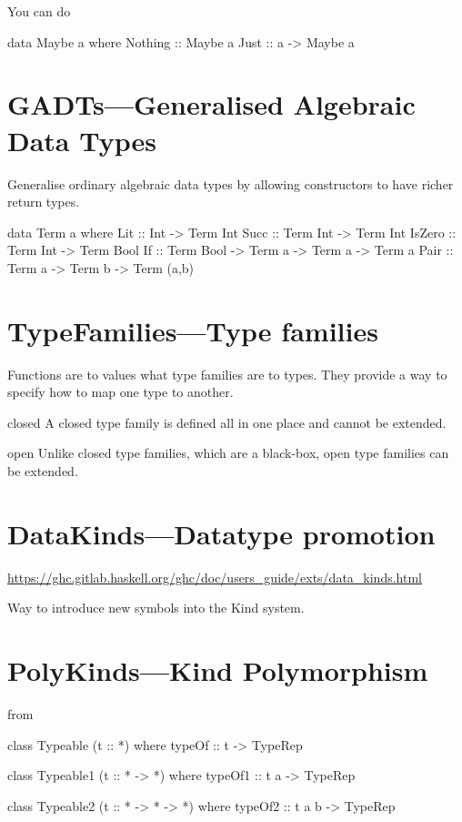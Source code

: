 \documentclass[openany, 12pt]{book}
\begin{document}
You can do
\begin{haskell}{}
data Maybe a where
    Nothing :: Maybe a
    Just    :: a -> Maybe a
\end{haskell}

\chapter{GADTs---Generalised Algebraic Data Types}
Generalise ordinary algebraic data types by allowing constructors to have richer
return types.

\begin{haskell}{}
data Term a where
    Lit    :: Int -> Term Int
    Succ   :: Term Int -> Term Int
    IsZero :: Term Int -> Term Bool
    If     :: Term Bool -> Term a -> Term a -> Term a
    Pair   :: Term a -> Term b -> Term (a,b)
\end{haskell}


\setcounter{chapter}{9}
\chapter{TypeFamilies---Type families}
Functions are to values what type families are to types. They provide a way to
specify how to map one type to another.

\begin{definition}{closed}{}
	A closed type family is defined all in one place and cannot be extended.
\end{definition}

\begin{definition}{open}{}
	Unlike closed type families, which are a black-box, open type families can be extended.
\end{definition}


\chapter{DataKinds---Datatype promotion}
\url{https://ghc.gitlab.haskell.org/ghc/doc/users_guide/exts/data_kinds.html}

Way to introduce new symbols into the Kind system.

\setcounter{chapter}{13}
\chapter{PolyKinds---Kind Polymorphism}
from
\begin{haskell}{}
class Typeable (t :: *) where
    typeOf :: t -> TypeRep

class Typeable1 (t :: * -> *) where
    typeOf1 :: t a -> TypeRep

class Typeable2 (t :: * -> * -> *) where
    typeOf2 :: t a b -> TypeRep
\end{haskell}
\end{document}
